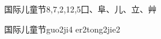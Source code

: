 \begin{entry}{国际儿童节}{8,7,2,12,5}{⼞、⾩、⼉、⽴、⾋}
  \begin{phonetics}{国际儿童节}{guo2ji4 er2tong2jie2}
  \end{phonetics}
\end{entry}
